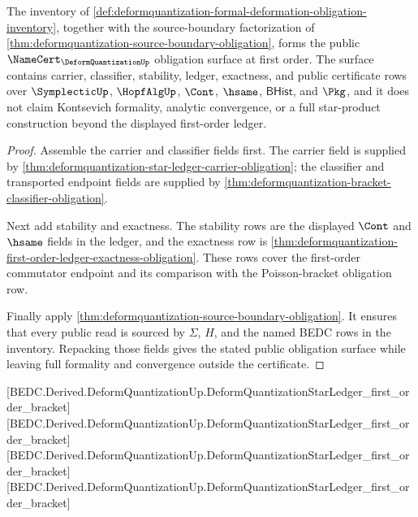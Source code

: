 \begin{theorem}
\label{thm:deformquantization-public-certificate-obligation-surface}
The inventory of \autoref{def:deformquantization-formal-deformation-obligation-inventory}, together with the source-boundary factorization of \autoref{thm:deformquantization-source-boundary-obligation}, forms the public $\NameCert_{\DeformQuantizationUp}$ obligation surface at first order. The surface contains carrier, classifier, stability, ledger, exactness, and public certificate rows over $\SymplecticUp$, $\HopfAlgUp$, $\Cont$, $\hsame$, $\mathsf{BHist}$, and $\Pkg$, and it does not claim Kontsevich formality, analytic convergence, or a full star-product construction beyond the displayed first-order ledger.
\end{theorem}
\begin{proof}
Assemble the carrier and classifier fields first. The carrier field is supplied by \autoref{thm:deformquantization-star-ledger-carrier-obligation}; the classifier and transported endpoint fields are supplied by \autoref{thm:deformquantization-bracket-classifier-obligation}.

Next add stability and exactness. The stability rows are the displayed $\Cont$ and $\hsame$ fields in the ledger, and the exactness row is \autoref{thm:deformquantization-first-order-ledger-exactness-obligation}. These rows cover the first-order commutator endpoint and its comparison with the Poisson-bracket obligation row.

Finally apply \autoref{thm:deformquantization-source-boundary-obligation}. It ensures that every public read is sourced by $\Sigma$, $H$, and the named BEDC rows in the inventory. Repacking those fields gives the stated public obligation surface while leaving full formality and convergence outside the certificate.
\end{proof}

[BEDC.Derived.DeformQuantizationUp.DeformQuantizationStarLedger\_first\_order\_bracket]
[BEDC.Derived.DeformQuantizationUp.DeformQuantizationStarLedger\_first\_order\_bracket]
[BEDC.Derived.DeformQuantizationUp.DeformQuantizationStarLedger\_first\_order\_bracket]
[BEDC.Derived.DeformQuantizationUp.DeformQuantizationStarLedger\_first\_order\_bracket]

